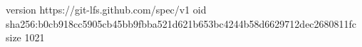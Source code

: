 version https://git-lfs.github.com/spec/v1
oid sha256:b0cb918cc5905cb45bb9fbba521d621b653bc4244b58d6629712dec2680811fc
size 1021
